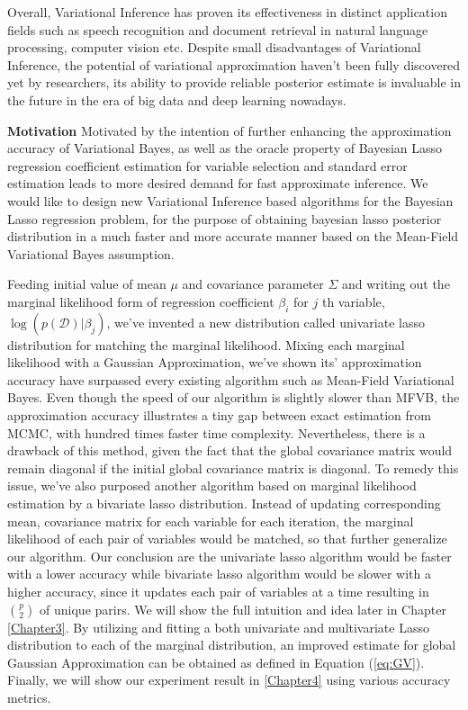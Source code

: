 Overall, Variational Inference has proven its effectiveness in distinct application fields such as speech recognition and document retrieval in natural language processing, computer vision etc. Despite small disadvantages of Variational Inference, the potential of variational approximation haven't been fully discovered yet by researchers, its ability to provide reliable posterior estimate is invaluable in the future in the era of big data and deep learning nowadays.

\textbf{Motivation}
Motivated by the intention of further enhancing the approximation accuracy of Variational Bayes, as well as the oracle property of Bayesian Lasso regression coefficient estimation for variable selection and standard error estimation leads to more desired demand for fast approximate inference. We would like to design new Variational Inference based algorithms for the Bayesian Lasso regression problem, for the purpose of obtaining bayesian lasso posterior distribution in a much faster and more accurate manner based on the Mean-Field Variational Bayes assumption.

Feeding initial value of mean $\mu$ and covariance parameter $\Sigma$ and writing out the marginal likelihood form of regression coefficient $\beta_i$ for $j$ th variable, $\log(p(\mathcal{D})|\beta_j)$, we've invented a new distribution called univariate lasso distribution for matching the marginal likelihood. Mixing each marginal likelihood with a Gaussian Approximation, we've shown its' approximation accuracy have surpassed every existing algorithm such as Mean-Field Variational Bayes. Even though the speed of our algorithm is slightly slower than MFVB, the approximation accuracy illustrates a tiny gap between exact estimation from MCMC, with hundred times faster time complexity.
Nevertheless, there is a drawback of this method, given the fact that the global covariance matrix would remain diagonal if the initial global covariance matrix is diagonal.
To remedy this issue, we've also purposed another algorithm based on marginal likelihood estimation by a bivariate lasso distribution. Instead of updating corresponding mean, covariance matrix for each variable for each iteration, the marginal likelihood of each pair of variables would be matched, so that further generalize our algorithm. Our conclusion are the univariate lasso algorithm would be faster with a lower accuracy while bivariate lasso algorithm would be slower with a higher accuracy, since it updates each pair of variables at a time resulting in ${p\choose 2}$ of unique parirs. We will show the full intuition and idea later in Chapter \ref{Chapter3}.
By utilizing and fitting a both univariate and multivariate Lasso distribution to each of the marginal distribution, an improved estimate for global Gaussian Approximation can be obtained as defined in Equation (\ref{eq:GV}). Finally, we will show our experiment result in \ref{Chapter4} using various accuracy metrics.

